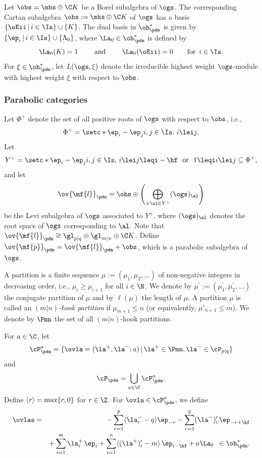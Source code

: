 \documentclass[11pt, reqno]{amsart}
\theoremstyle{definition}
\theoremstyle{remark}
\numberwithin{equation}{section}
\begin{document}
Let $\obs=\mbs \oplus \C K$ be a Borel subalgebra of $\ogs$.
The corresponding Cartan subalgebra $\ohs:=\mhs \oplus \C K$ of $\ogs$ has a basis $\{ \oEii \, | \, i \in \Is \}\cup \{K\}$.
The dual basis in $\oh_\pdn^*$ is given by $\{ \ep_i  \, | \, i \in \Is \} \cup \{\Lambda_0 \}$,
where $\La_0 \in \oh_\pdn^*$ is defined by
 $$
 \La_0(K)=1 \qquad \textrm{ and }   \qquad \La_0(\oEii)=0 \qquad \mbox{for $\, i \in \Is$.}
 $$
For $\xi \in \oh_\pdn^*$, let $L(\ogs, \xi)$ denote the irreducible highest weight $\ogs$-module with highest weight $\xi$ with respect to $\obs$.

\subsubsection{Parabolic categories}

Let $\Phi^+$ denote the set of all positive roots of $\ogs$ with respect to $\obs$, i.e.,
$$
\Phi^+=\setc*{\ep_i-\ep_j }{i,j \in \Is,\, i \lei j }.
$$
Let
$$
Y^+=\setc*{\ep_i-\ep_j }{i,j \in \Is,\, i \lei j \leqi -\hf \ \  \mbox{or}\ \  1\leqi i \lei  j }  \subseteq \Phi^+,
$$
and let
$$\ov{\mf{l}}_\pdn=\ohs \oplus \left(\bigoplus\limits_{\pm \al \in Y^+ } (\ogs)_\al \right)$$
be the Levi subalgebra of $\ogs$ associated to $Y^+$, where $(\ogs)_\al$ denotes the root space of $\ogs$ corresponding to $\al$.
Note that $\ov{\mf{l}}_\pdn \cong  \gl_{p|q} \oplus  \gl_{m|n} \oplus \C K$.
%
Define $\ov{\mf{p}}_\pdn=\ov{\mf{l}}_\pdn+\obs$, which is a parabolic subalgebra of $\ogs$.


A partition is a finite sequence $\mu:=(\mu_1, \mu_2, \ldots )$ of non-negative integers in decreasing order, i.e., $\mu_i \ge \mu_{i+1}$ for all $i \in \N$.
We denote by $\mu^\prime:=(\mu_1^\prime, \mu_2^\prime, \ldots)$ the conjugate partition of $\mu$ and by $\ell(\mu)$ the length of $\mu$.
A partition $\mu$ is called an \emph{$(m|n)$-hook partition} if $\mu_{m+1} \le n$ (or equivalently, $\mu'_{n+1} \le m$).
We denote by $\Pmn$ the set of all $(m|n)$-hook partitions.

For $a \in \C$, let
$$
\cP_\pdn^a=\{ \ovla=(\la^+, \la^-; a)\,|\, \la^+\in \Pmn, \la^-\in \cP_{p|q}\}
$$
and
$$
 \cP_\pdn=\bigcup_{a\in \C}\cP_\pdn^a.
$$
Define $\langle r \rangle={\rm max}\{r, 0 \}$ for $r \in \Z$.
For $\ovla \in \cP_\pdn^a$, we define
{\allowdisplaybreaks
\begin{eqnarray}\label{hlas}
 \ovlas=& &-\sum_{r=1}^{p} \langle \la^{-}_{r}-q \rangle \ep_{-r}- \sum_{r=1}^{q} (\la^{-})^\prime_{r} \ep_{-r+\hf} \nonumber  \\
& &  +\sum_{i=1}^m \la^+_i \, \ep_i+\sum_{i=1}^n\langle(\la^+)'_i-m\rangle \,\ep_{i-\hf }+a \La_0 \,\, \, \in \oh_\pdn^*.
\end{eqnarray}
}
\end{document}

